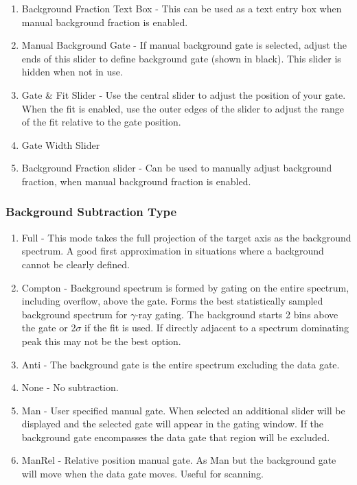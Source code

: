 \documentclass[a4paper,10pt]{article}
\begin{document}
\begin{enumerate}
\item Background Fraction Text Box - This can be used as a text entry box when manual background fraction is enabled.
\item Manual Background Gate - If manual background gate is selected, adjust the ends of this slider to define background gate (shown in black). This slider is hidden when not in use.
\item Gate \& Fit Slider - Use the central slider to adjust the position of your gate. When the fit is enabled, use the outer edges of the slider to adjust the range of the fit relative to the gate position.
\item Gate Width Slider
\item Background Fraction slider - Can be used to manually adjust background fraction, when manual background fraction is enabled.
\end{enumerate}

\subsubsection{Background Subtraction Type}
\begin{enumerate}
\item Full - This mode takes the full projection of the target axis as the background spectrum. A good first approximation in situations where a background cannot be clearly defined.
\item Compton - Background spectrum is formed by gating on the entire spectrum, including overflow, above the gate. Forms the best statistically sampled background spectrum for $\gamma$-ray gating. The background starts 2 bins above the gate or 2$\sigma$ if the fit is used. If directly adjacent to a spectrum dominating peak this may not be the best option. 
\item Anti - The background gate is the entire spectrum excluding the data gate.
\item None - No subtraction.
\item Man - User specified manual gate. When selected an additional slider will be displayed and the selected gate will appear in the gating window. If the background gate encompasses the data gate that region will be excluded.
\item ManRel - Relative position manual gate. As Man but the background gate will move when the data gate moves. Useful for scanning.
\end{enumerate}
\end{document}
